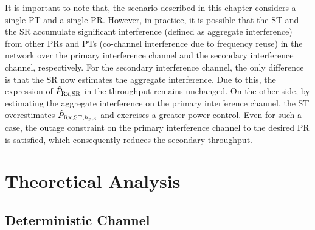 \begin{remark}
\normalfont
It is important to note that, the scenario described in this chapter considers a single PT and a single PR. However, in practice, it is possible that the ST and the SR accumulate significant interference (defined as aggregate interference) from other PRs and PTs (co-channel interference due to frequency reuse) in the network\cite{Elsawy13_cmag,Kaushik14_P} over the primary interference channel and the secondary interference channel, respectively. For the secondary interference channel, the only difference is that the SR now estimates the aggregate interference. Due to this, the expression of $\hat{P}_{\text{Rx,SR}}$ in the throughput remains unchanged. On the other side, by estimating the aggregate interference on the primary interference channel, the ST overestimates $\hat{P}_{\text{Rx,ST,$h_{\text{p,3}}$}}$ and exercises a greater power control. Even for such a case, the outage constraint on the primary interference channel to the desired PR is satisfied, which consequently reduces the secondary throughput.  
\end{remark}
\section{Theoretical Analysis} \label{sec_US:th_ana}

\subsection{Deterministic Channel} \label{ssec_US:stpa}


